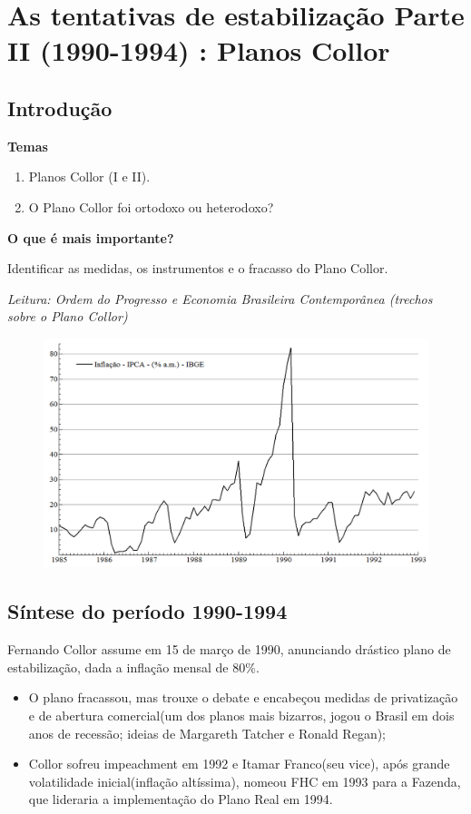 \documentclass[a4paper,12pt]{article}[abntex2]
\begin{document}
\newpage
\section{\textbf{As tentativas de estabilização Parte II (1990-1994) : Planos Collor}}
\subsection{\textbf{Introdução}}
\textbf{Temas}
\begin{enumerate}
    \item Planos Collor (I e II).
    \item O Plano Collor foi ortodoxo ou heterodoxo?
\end{enumerate}

\textbf{O que é mais importante?}

Identificar as medidas, os instrumentos e o fracasso do Plano Collor.

\textit{Leitura: Ordem do Progresso e Economia Brasileira Contemporânea (trechos sobre o Plano Collor)}
\begin{figure}[H]
    \centering
    \includegraphics[width=0.7\linewidth]{Imagens/a12i1.png}
\end{figure}

\subsection{\textbf{Síntese do período 1990-1994}}
Fernando Collor assume em 15 de março de 1990, anunciando drástico plano de estabilização, dada a inflação mensal de 80\%.

\begin{itemize}
    \item O plano fracassou, mas trouxe o debate e encabeçou medidas de privatização e de abertura comercial(um dos planos mais bizarros, jogou o Brasil em dois anos de recessão; ideias de Margareth Tatcher e Ronald Regan);
    \item Collor sofreu impeachment em 1992 e Itamar Franco(seu vice), após grande volatilidade inicial(inflação altíssima), nomeou FHC em 1993 para a Fazenda, que lideraria a implementação do Plano Real em 1994.
\end{itemize}
\end{document}
